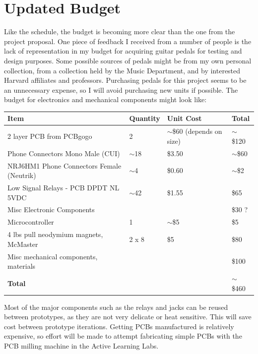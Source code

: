\documentclass{article}
\begin{document}
\section{Updated Budget}

Like the schedule, the budget is becoming more clear than the one from the project proposal.  One piece of feedback I received from a number of people is the lack of representation in my budget for acquiring guitar pedals for testing and design purposes.  Some possible sources of pedals might be from my own personal collection, from a collection held by the Music Department, and by interested Harvard affiliates and professors.  Purchasing pedals for this project seems to be an unnecessary expense, so I will avoid purchasing new units if possible.  The budget for electronics and mechanical components might look like:

\begin{table}[H]
\begin{tabular}{llll}
Item                     & Quantity & Unit Cost & Total      \\
\hline
2 layer PCB from PCBgogo                    & 2        & $\sim$\$60 (depends on size) & $\sim$\$120     \\
Phone Connectors Mono Male (CUI)            & $\sim$18     & \$3.50    & $\sim$\$60 \\
NRJ6HM1 Phone Connectors Female (Neutrik)   & $\sim$4      & \$0.60    & $\sim$\$2  \\
Low Signal Relays - PCB DPDT NL 5VDC		& $\sim$42& \$1.55	  & \$65 			\\
Misc Electronic Components                  &         &           & \$30 ?          \\
Microcontroller                             & 1       & $\sim$\$5 & \$5             \\
4 lbs pull neodymium magnets, McMaster      & 2 x 8   & \$5       & \$80            \\
Misc mechanical components, materials       &         &           & \$100           \\
\textbf{Total}                              &         &           &  $\sim$\$460    \\
\end{tabular}
\end{table}

Most of the major components such as the relays and jacks can be reused between prototypes, as they are not very delicate or heat sensitive.  This will save cost between prototype iterations.  Getting PCBs manufactured is relatively expensive, so effort will be made to attempt fabricating simple PCBs with the PCB milling machine in the Active Learning Labs.
\end{document}
